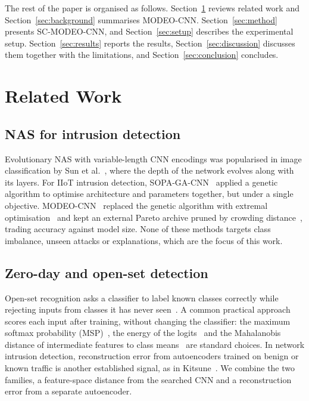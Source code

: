 \documentclass[10pt,twocolumn,letterpaper]{article}
\begin{document}
The rest of the paper is organised as follows. Section~\ref{sec:related}
reviews related work and Section~\ref{sec:background} summarises
MODEO-CNN. Section~\ref{sec:method} presents SC-MODEO-CNN, and
Section~\ref{sec:setup} describes the experimental setup.
Section~\ref{sec:results} reports the results, Section~\ref{sec:discussion}
discusses them together with the limitations, and
Section~\ref{sec:conclusion} concludes.


\section{Related Work}\label{sec:related}

\subsection{NAS for intrusion detection}
Evolutionary NAS with variable-length CNN encodings was popularised in
image classification by Sun et al.~\cite{sun2020cnnga}, where the depth of
the network evolves along with its layers. For IIoT intrusion detection,
SOPA-GA-CNN~\cite{huang2023sopa} applied a genetic algorithm to optimise
architecture and parameters together, but under a single objective.
MODEO-CNN~\cite{lu2025modeo} replaced the genetic algorithm with extremal
optimisation~\cite{boettcher2000eo} and kept an external Pareto archive
pruned by crowding distance~\cite{deb2002nsga2}, trading accuracy against
model size. None of these methods targets class imbalance, unseen attacks
or explanations, which are the focus of this work.

\subsection{Zero-day and open-set detection}
Open-set recognition asks a classifier to label known classes correctly
while rejecting inputs from classes it has never seen~\cite{scheirer2013openset}.
A common practical approach scores each input after training, without
changing the classifier: the maximum softmax probability
(MSP)~\cite{hendrycks2017msp}, the energy of the logits~\cite{liu2020energy}
and the Mahalanobis distance of intermediate features to class
means~\cite{lee2018maha} are standard choices. In network intrusion
detection, reconstruction error from autoencoders trained on benign or
known traffic is another established signal, as in
Kitsune~\cite{mirsky2018kitsune}. We combine the two families, a
feature-space distance from the searched CNN and a reconstruction error
from a separate autoencoder.
\end{document}
